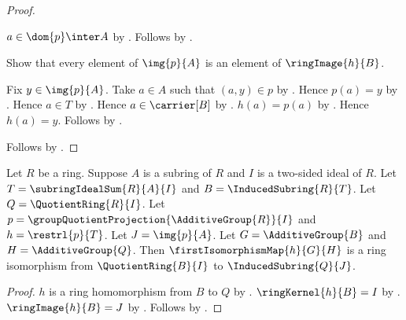 \begin{proof}
\begin{subproof}
        $a\in\dom{p}\inter A$ by .
        Follows by .
    \end{subproof}
    Show that every element of $\img{p}{A}$ is an element of
        $\ringImage{h}{B}$.
    \begin{subproof}
        Fix $y\in\img{p}{A}$.
        Take $a\in A$ such that $(a,y)\in p$ by .
        Hence $p(a)=y$ by .
        Hence $a\in T$ by .
        Hence $a\in\carrier[B]$ by .
        $h(a)=p(a)$ by .
        Hence $h(a)=y$.
        Follows by .
    \end{subproof}
    Follows by .
\end{proof}

\begin{theorem}\label{ring_second_isomorphism_image_form}
    Let $R$ be a ring.
    Suppose $A$ is a subring of $R$ and
        $I$ is a two-sided ideal of $R$.
    Let $T=\subringIdealSum{R}{A}{I}$ and
        $B=\InducedSubring{R}{T}$.
    Let $Q=\QuotientRing{R}{I}$.
    Let $p=\groupQuotientProjection{\AdditiveGroup{R}}{I}$ and
        $h=\restrl{p}{T}$.
    Let $J=\img{p}{A}$.
    Let $G=\AdditiveGroup{B}$ and $H=\AdditiveGroup{Q}$.
    Then $\firstIsomorphismMap{h}{G}{H}$ is a ring isomorphism from
        $\QuotientRing{B}{I}$ to $\InducedSubring{Q}{J}$.
\end{theorem}
\begin{proof}
    $h$ is a ring homomorphism from $B$ to $Q$ by
        .
    $\ringKernel{h}{B}=I$ by
        .
    $\ringImage{h}{B}=J$ by
        .
    Follows by .
\end{proof}

